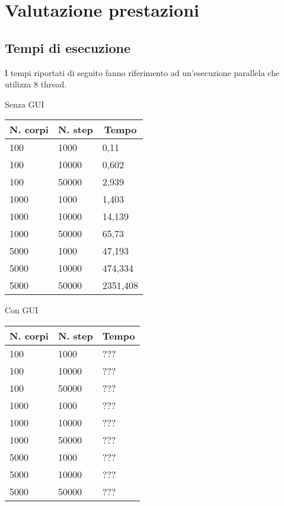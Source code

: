 \documentclass[12pt,a4paper,oneside,draft]{article}
\begin{document}
	\section{Valutazione prestazioni}
	\subsection{Tempi di esecuzione}
	I tempi riportati di seguito fanno riferimento ad un'esecuzione parallela che utilizza 8 thread.
	
	\hfill
	\begin{minipage}{.4\textwidth}
		Senza GUI
		
		\begin{tabular}{|l|l|l|}
			\hline
			\multicolumn{1}{|c|}{\textbf{N. corpi}} & \multicolumn{1}{c|}{\textbf{N. step}} & \multicolumn{1}{c|}{\textbf{Tempo}} \\ \hline
			100 & 1000 & 0,11 \\ \hline
			100 & 10000 & 0,602 \\ \hline
			100 & 50000 & 2,939 \\ \hline
			1000 & 1000 & 1,403 \\ \hline
			1000 & 10000 & 14,139 \\ \hline
			1000 & 50000 & 65,73 \\ \hline
			5000 & 1000 & 47,193 \\ \hline
			5000 & 10000 & 474,334 \\ \hline
			5000 & 50000 & 2351,408 \\ \hline
		\end{tabular}
	\end{minipage}
	\hfill
	\begin{minipage}{.4\textwidth}
		Con GUI
		
		\begin{tabular}{|l|l|l|}
			\hline
			\multicolumn{1}{|c|}{\textbf{N. corpi}} & \multicolumn{1}{c|}{\textbf{N. step}} & \multicolumn{1}{c|}{\textbf{Tempo}} \\ \hline
			100 & 1000 & ??? \\ \hline
			100 & 10000 & ??? \\ \hline
			100 & 50000 & ??? \\ \hline
			1000 & 1000 & ??? \\ \hline
			1000 & 10000 & ??? \\ \hline
			1000 & 50000 & ??? \\ \hline
			5000 & 1000 & ??? \\ \hline
			5000 & 10000 & ??? \\ \hline
			5000 & 50000 & ??? \\ \hline
		\end{tabular}
	\end{minipage}
	\hfill
\end{document}
